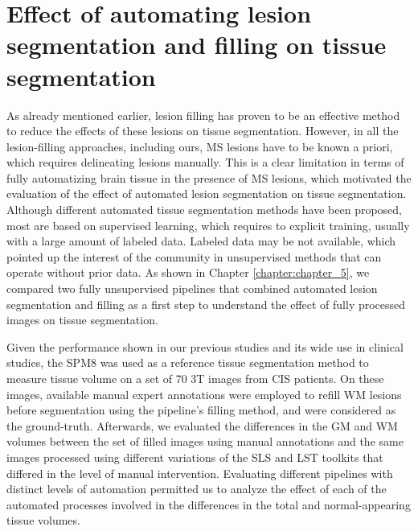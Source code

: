 \section{Effect of automating lesion segmentation and filling on  tissue segmentation}
\label{sec:label}

As already mentioned earlier, lesion filling has proven to be an effective method to reduce the effects of these lesions on tissue segmentation. However, in all the lesion-filling approaches, including ours, MS lesions have to be known a priori, which requires delineating lesions manually. This is a clear limitation in terms of fully automatizing brain tissue in the presence of MS lesions, which motivated the evaluation of the effect of automated lesion segmentation on tissue segmentation. Although different automated tissue segmentation methods have been proposed, most are based on supervised learning, which requires to explicit training, usually with a large amount of labeled data. Labeled data may be not available, which  pointed up the interest of the community in unsupervised methods that can operate without prior data. As shown in Chapter \ref{chapter:chapter_5}, we compared two fully unsupervised pipelines that combined automated lesion segmentation and filling as a first step to understand the effect of fully processed images on tissue segmentation. 
 
Given the performance shown in our previous studies and its wide use in clinical studies, the SPM8 was used as a reference tissue segmentation method to measure tissue volume on a set of 70 3T images from CIS patients. On these images, available manual expert annotations were employed to refill WM lesions before segmentation using the pipeline's filling method, and were considered as the ground-truth. Afterwards, we evaluated the differences in the GM and WM volumes between the set of filled images using manual annotations and the same images processed using different variations of the SLS and LST toolkits that differed in the level of manual intervention.  Evaluating different pipelines with distinct levels of automation  permitted us to analyze the effect of each of the automated processes involved in the differences in the total and normal-appearing tissue volumes.  

